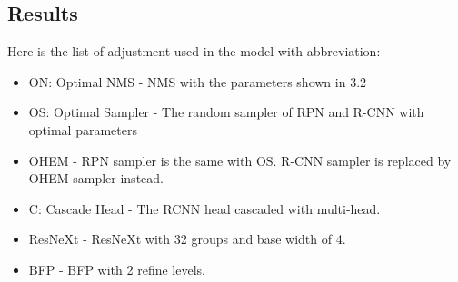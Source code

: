 \documentclass{article}
\begin{document}
\subsection{Results}
Here is the list of adjustment used in the model with abbreviation:
\begin{itemize}
    \item ON: Optimal NMS - NMS with the parameters shown in 3.2
    \item OS: Optimal Sampler - The random sampler of RPN and R-CNN with optimal parameters
    \item OHEM - RPN sampler is the same with OS. R-CNN sampler is replaced by OHEM sampler\cite{ohem} instead.
    \item C: Cascade Head - The RCNN head cascaded with multi-head.
    \item ResNeXt - ResNeXt with 32 groups and base width of 4.
    \item BFP - BFP with 2 refine levels.

\end{itemize}
\end{document}
